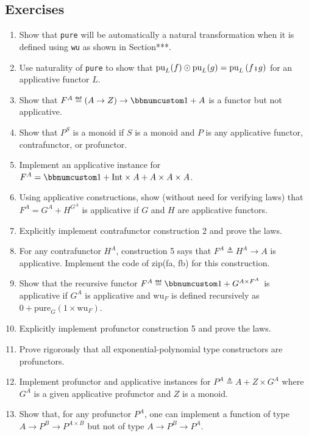 \subsection{Exercises}
\begin{enumerate}
\item Show that \lstinline!pure! will be automatically a natural transformation
when it is defined using \lstinline!wu! as shown in Section{*}{*}{*}.
\item Use naturality of \lstinline!pure! to show that $\text{pu}_{L}(f)\odot\text{pu}_{L}(g)=\text{pu}_{L}\left(f\bef g\right)$
for an applicative functor $L$.
\item Show that $F^{A}\triangleq\left(A\rightarrow Z\right)\rightarrow\bbnum 1+A$
is a functor but not applicative.
\item Show that $P^{S}$ is a monoid if $S$ is a monoid and $P$ is any
applicative functor, contrafunctor, or profunctor.
\item Implement an applicative instance for $F^{A}=\bbnum 1+\text{Int}\times A+A\times A\times A$.
\item Using applicative constructions, show (without need for verifying
laws) that $F^{A}=G^{A}+H^{G^{A}}$ is applicative if $G$ and $H$
are applicative functors.
\item Explicitly implement contrafunctor construction 2 and prove the laws.
\item For any contrafunctor $H^{A}$, construction 5 says that $F^{A}\triangleq H^{A}\rightarrow A$
is applicative. Implement the code of zip(fa, fb) for this construction.
\item Show that the recursive functor $F^{A}\triangleq\bbnum 1+G^{A\times F^{A}}$
is applicative if $G^{A}$ is applicative and $\text{wu}_{F}$ is
defined recursively as $0+\text{pure}_{G}\left(1\times\text{wu}_{F}\right)$.
\item Explicitly implement profunctor construction 5 and prove the laws. 
\item Prove rigorously that all exponential-polynomial type constructors
are profunctors.
\item Implement profunctor and applicative instances for $P^{A}\triangleq A+Z\times G^{A}$
where $G^{A}$ is a given applicative profunctor and $Z$ is a monoid.
\item Show that, for any profunctor $P^{A}$, one can implement a function
of type $A\rightarrow P^{B}\rightarrow P^{A\times B}$ but not of
type $A\rightarrow P^{B}\rightarrow P^{A}$. 
\end{enumerate}

